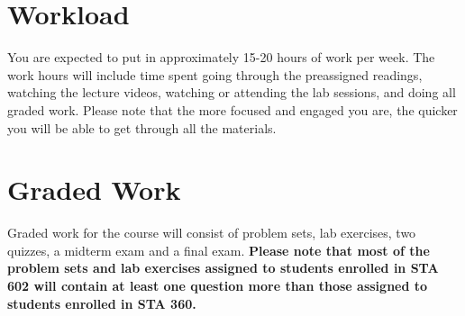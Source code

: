 \documentclass[11pt, a4paper]{article}
\begin{document}
\section{Workload}
You are expected to put in approximately 15-20 hours of work per week. %
The work hours will include time spent going through the preassigned readings, watching the lecture videos, watching or attending the lab sessions, and doing all graded work. Please note that the more focused and engaged you are, the quicker you will be able to get through all the materials.

\section{Graded Work} 
Graded work for the course will consist of problem sets, lab exercises, two quizzes, a midterm exam and a final exam. \textbf{Please note that most of the problem sets and lab exercises assigned to students enrolled in STA 602 will contain at least one question more than those assigned to students enrolled in STA 360. }
\end{document}

